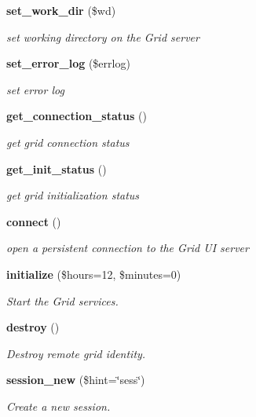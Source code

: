 \begin{CompactItemize}
{\bf set\_\-work\_\-dir} (\$wd)
\begin{CompactList}\small\item\em set working directory on the Grid server \item\end{CompactList}\item 
{\bf set\_\-error\_\-log} (\$errlog)
\begin{CompactList}\small\item\em set error log \item\end{CompactList}\item 
{\bf get\_\-connection\_\-status} ()
\begin{CompactList}\small\item\em get grid connection status \item\end{CompactList}\item 
{\bf get\_\-init\_\-status} ()
\begin{CompactList}\small\item\em get grid initialization status \item\end{CompactList}\item 
{\bf connect} ()
\begin{CompactList}\small\item\em open a persistent connection to the Grid UI server \item\end{CompactList}\item 
{\bf initialize} (\$hours=12, \$minutes=0)
\begin{CompactList}\small\item\em Start the Grid services. \item\end{CompactList}\item 
{\bf destroy} ()
\begin{CompactList}\small\item\em Destroy remote grid identity. \item\end{CompactList}\item 
{\bf session\_\-new} (\$hint=\char`\"{}sess\char`\"{})
\begin{CompactList}\small\item\em Create a new session. \item\end{CompactList}\item 

\end{CompactItemize}
